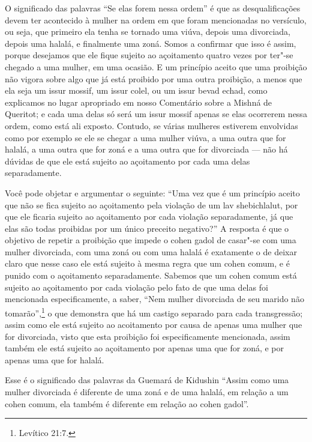 \begin{multicols}{2}
O significado das palavras ``Se elas forem nessa ordem'' é que as
desqualificações devem ter acontecido à mulher na ordem em que foram
mencionadas no versículo, ou seja, que primeiro ela tenha se tornado uma
viúva, depois uma divorciada, depois uma halalá\starr, e finalmente uma
zoná\starr. Somos a confirmar que isso é assim, porque desejamos que ele
fique sujeito ao açoitamento quatro vezes por ter"-se chegado a uma
mulher, em uma ocasião. E um princípio aceito que uma proibição não
vigora sobre algo que já está proibido por uma outra proibição, a menos
que ela seja um issur mossif\starr, um issur
colel\starr, ou um issur bevad
echad\starr, como explicamos no lugar apropriado em
nosso Comentário sobre a Mishná\starr{} de Queritot\starr; e cada uma delas só
será um issur mossif\starr{} apenas se elas ocorrerem nessa ordem, como está
ali exposto. Contudo, se várias mulheres estiverem envolvidas como por
exemplo se ele se chegar a uma mulher viúva, a uma outra que for
halalá\starr, a uma outra que for zoná\starr{} e a uma outra que for
divorciada --- não há dúvidas de que ele está sujeito ao açoitamento por
cada uma delas separadamente.

Você pode objetar e argumentar o seguinte: ``Uma vez que é um princípio
aceito que não se fica sujeito ao açoitamento pela violação de um lav shebichlalut\starr, por que ele ficaria sujeito ao
açoitamento por cada violação separadamente, já que elas são todas
proibidas por um único preceito negativo?'' A resposta é que o objetivo
de repetir a proibição que impede o cohen gadol\starr{} de casar"-se com uma
mulher divorciada, com uma zoná\starr{} ou com uma halalá\starr{} é exatamente o
de deixar claro que nesse caso ele está sujeito à mesma regra que um
cohen\starr{} comum, e é punido com o açoitamento separadamente. Sabemos
que um cohen\starr{} comum está sujeito ao açoitamento por cada violação
pelo fato de que uma delas foi mencionada especificamente, a saber,
``Nem mulher divorciada de seu marido não tomarão'',\footnote{Levítico 21:7.} o
que demonstra que há um castigo separado para cada transgressão; assim
como ele está sujeito ao acoitamento por causa de apenas uma mulher que
for divorciada, visto que esta proibição foi especificamente mencionada,
assim também ele está sujeito ao açoitamento por apenas uma que for
zoná\starr, e por apenas uma que for halalá\starr.


Esse é o significado das palavras da Guemará\starr{} de Kidushin\starr{} ``Assim como
uma mulher divorciada é diferente de uma zoná\starr{} e de uma halalá\starr, em
relação a um cohen\starr{} comum, ela também é diferente em relação ao cohen gadol\starr''.


\end{multicols}
